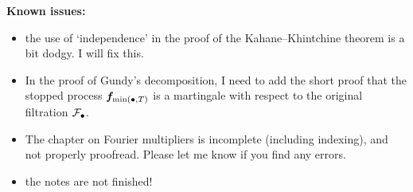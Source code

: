 \textbf{Known issues:}
\begin{itemize}
\item the use of `independence' in the proof of the Kahane--Khintchine theorem is a bit dodgy. I will fix this.
\item In the proof of Gundy's decomposition, I need to add the short proof that the stopped process $\bm{f}_{\min(\bullet, T)}$ is a martingale with respect to the original filtration $\mathcal{F}_{\bullet}$.
\item The chapter on Fourier multipliers is incomplete (including indexing), and not properly proofread. Please let me know if you find any errors.
\item the notes are not finished!
\end{itemize}

  





